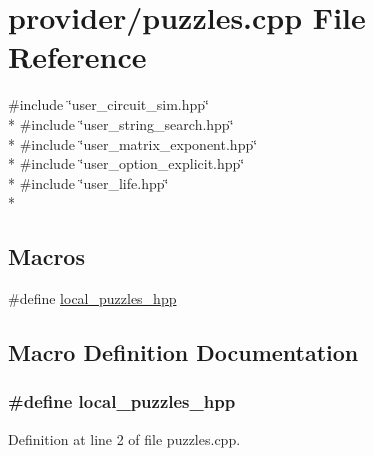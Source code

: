\hypertarget{a00134}{}\section{provider/puzzles.cpp File Reference}
\label{a00134}
{\ttfamily \#include \char`\"{}user\+\_\+circuit\+\_\+sim.\+hpp\char`\"{}}\\*
{\ttfamily \#include \char`\"{}user\+\_\+string\+\_\+search.\+hpp\char`\"{}}\\*
{\ttfamily \#include \char`\"{}user\+\_\+matrix\+\_\+exponent.\+hpp\char`\"{}}\\*
{\ttfamily \#include \char`\"{}user\+\_\+option\+\_\+explicit.\+hpp\char`\"{}}\\*
{\ttfamily \#include \char`\"{}user\+\_\+life.\+hpp\char`\"{}}\\*
\subsection*{Macros}
\begin{DoxyCompactItemize}
\item 
\#define \hyperlink{a00134_a6cbefc5b53d93ca9e4f2410991181da9}{local\+\_\+puzzles\+\_\+hpp}
\end{DoxyCompactItemize}


\subsection{Macro Definition Documentation}
\hypertarget{a00134_a6cbefc5b53d93ca9e4f2410991181da9}{}
\subsubsection[{local\+\_\+puzzles\+\_\+hpp}]{\setlength{\rightskip}{0pt plus 5cm}\#define local\+\_\+puzzles\+\_\+hpp}\label{a00134_a6cbefc5b53d93ca9e4f2410991181da9}


Definition at line 2 of file puzzles.\+cpp.

